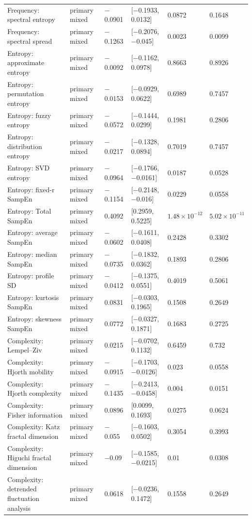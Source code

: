 \documentclass[10pt]{article}
\begin{document}
\begin{landscape}
\begin{longtable}{p{4.4cm}p{3.6cm}p{2.0cm}p{3.6cm}p{2.0cm}p{2.0cm}}
Frequency: spectral entropy & primary mixed & $-$0.0901 & [$-$0.1933, 0.0132] & 0.0872 & 0.1648 \\
Frequency: spectral spread & primary mixed & $-$0.1263 & [$-$0.2076, $-$0.045] & 0.0023 & 0.0099 \\
Entropy: approximate entropy & primary mixed & $-$0.0092 & [$-$0.1162, 0.0978] & 0.8663 & 0.8926 \\
Entropy: permutation entropy & primary mixed & $-$0.0153 & [$-$0.0929, 0.0622] & 0.6989 & 0.7457 \\
Entropy: fuzzy entropy & primary mixed & $-$0.0572 & [$-$0.1444, 0.0299] & 0.1981 & 0.2806 \\
Entropy: distribution entropy & primary mixed & $-$0.0217 & [$-$0.1328, 0.0894] & 0.7019 & 0.7457 \\
Entropy: SVD entropy & primary mixed & $-$0.0964 & [$-$0.1766, $-$0.0161] & 0.0187 & 0.0528 \\
Entropy: fixed-r SampEn & primary mixed & $-$0.1154 & [$-$0.2148, $-$0.016] & 0.0229 & 0.0558 \\
Entropy: Total SampEn & primary mixed & 0.4092 & [0.2959, 0.5225] & $1.48\times10^{-12}$ & $5.02\times10^{-11}$ \\
Entropy: average SampEn & primary mixed & $-$0.0602 & [$-$0.1611, 0.0408] & 0.2428 & 0.3302 \\
Entropy: median SampEn & primary mixed & $-$0.0735 & [$-$0.1832, 0.0362] & 0.1893 & 0.2806 \\
Entropy: profile SD & primary mixed & $-$0.0412 & [$-$0.1375, 0.0551] & 0.4019 & 0.5061 \\
Entropy: kurtosis SampEn & primary mixed & 0.0831 & [$-$0.0303, 0.1965] & 0.1508 & 0.2649 \\
Entropy: skewness SampEn & primary mixed & 0.0772 & [$-$0.0327, 0.1871] & 0.1683 & 0.2725 \\
Complexity: Lempel--Ziv & primary mixed & 0.0215 & [$-$0.0702, 0.1132] & 0.6459 & 0.732 \\
Complexity: Hjorth mobility & primary mixed & $-$0.0915 & [$-$0.1703, $-$0.0126] & 0.023 & 0.0558 \\
Complexity: Hjorth complexity & primary mixed & $-$0.1435 & [$-$0.2413, $-$0.0458] & 0.004 & 0.0151 \\
Complexity: Fisher information & primary mixed & 0.0896 & [0.0099, 0.1693] & 0.0275 & 0.0624 \\
Complexity: Katz fractal dimension & primary mixed & $-$0.055 & [$-$0.1603, 0.0502] & 0.3054 & 0.3993 \\
Complexity: Higuchi fractal dimension & primary mixed & $-$0.09 & [$-$0.1585, $-$0.0215] & 0.01 & 0.0308 \\
Complexity: detrended fluctuation analysis & primary mixed & 0.0618 & [$-$0.0236, 0.1472] & 0.1558 & 0.2649 \\
\bottomrule
\end{longtable}
\medskip

\end{landscape}
\end{document}
